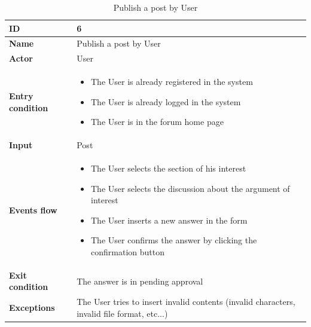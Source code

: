     \begin{longtable}{p{} | p{}}
    \caption{Publish a post by User}
        \label{tab:publish_post_by_user}\\
        \hline
        \textbf{ID} & 6\\
        \hline
        \textbf{Name}  &  Publish a post by User\\
        \hline
        \textbf{Actor}  &  User\\
        \hline
        \textbf{Entry condition}  &  
        \begin{itemize}
                \item The User is already registered in the system
                \item The User is already logged in the system
                \item The User is in the forum home page
         \end{itemize}\\
        \hline
        \textbf{Input} & Post\\
        \hline
        \textbf{Events flow} & 
        \begin{itemize}
                \item The User selects the section of his interest
                \item The User selects the discussion about the argument of interest
                \item The User inserts a new answer in the form
                \item The User confirms the answer by clicking the confirmation button
                 \end{itemize}
                 \\
        \hline
        \textbf{Exit condition} & The answer is in pending approval\\
        \hline
        \textbf{Exceptions} & The User tries to insert invalid contents (invalid characters, invalid file format, etc...)\\
        \hline
        
    \end{longtable}
    
